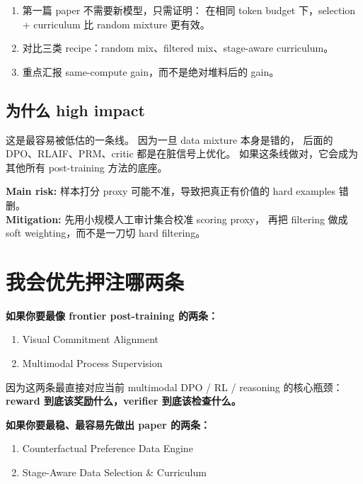 \documentclass[12pt,a4paper]{article}
\begin{document}
\begin{expbox}
\begin{enumerate}[leftmargin=2em]
  \item 第一篇 paper 不需要新模型，只需证明：
    在相同 token budget 下，selection + curriculum 比 random mixture 更有效。
  \item 对比三类 recipe：random mix、filtered mix、stage-aware curriculum。
  \item 重点汇报 same-compute gain，而不是绝对堆料后的 gain。
\end{enumerate}
\end{expbox}

\subsection{为什么 high impact}

这是最容易被低估的一条线。
因为一旦 data mixture 本身是错的，
后面的 DPO、RLAIF、PRM、critic 都是在脏信号上优化。
如果这条线做对，它会成为其他所有 post-training 方法的底座。

\begin{riskbox}
\textbf{Main risk:}
样本打分 proxy 可能不准，导致把真正有价值的 hard examples 错删。\\
\textbf{Mitigation:}
先用小规模人工审计集合校准 scoring proxy，
再把 filtering 做成 soft weighting，而不是一刀切 hard filtering。
\end{riskbox}

\newpage
\section*{我会优先押注哪两条}

\textbf{如果你要最像 frontier post-training 的两条：}
\begin{enumerate}[leftmargin=2em]
  \item Visual Commitment Alignment
  \item Multimodal Process Supervision
\end{enumerate}

因为这两条最直接对应当前 multimodal DPO / RL / reasoning 的核心瓶颈：
\textbf{reward 到底该奖励什么，verifier 到底该检查什么。}

\textbf{如果你要最稳、最容易先做出 paper 的两条：}
\begin{enumerate}[leftmargin=2em]
  \item Counterfactual Preference Data Engine
  \item Stage-Aware Data Selection \& Curriculum
\end{enumerate}
\end{document}
